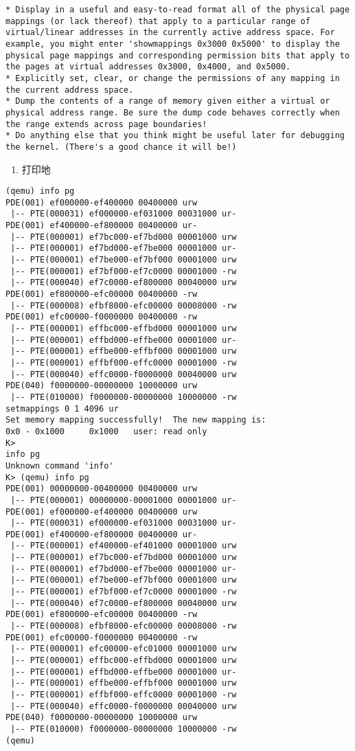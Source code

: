 \documentclass{article}
\begin{document}
\begin{CJK*}{UTF8}{gkai}
\begin{lstlisting}[style=challenge]
* Display in a useful and easy-to-read format all of the physical page mappings (or lack thereof) that apply to a particular range of virtual/linear addresses in the currently active address space. For example, you might enter 'showmappings 0x3000 0x5000' to display the physical page mappings and corresponding permission bits that apply to the pages at virtual addresses 0x3000, 0x4000, and 0x5000.
* Explicitly set, clear, or change the permissions of any mapping in the current address space.
* Dump the contents of a range of memory given either a virtual or physical address range. Be sure the dump code behaves correctly when the range extends across page boundaries!
* Do anything else that you think might be useful later for debugging the kernel. (There's a good chance it will be!)
\end{lstlisting}

\begin{enumerate}
\item{打印地}
\end{enumerate}

\begin{lstlisting}[style=console]
(qemu) info pg
PDE(001) ef000000-ef400000 00400000 urw
 |-- PTE(000031) ef000000-ef031000 00031000 ur-
PDE(001) ef400000-ef800000 00400000 ur-
 |-- PTE(000001) ef7bc000-ef7bd000 00001000 urw
 |-- PTE(000001) ef7bd000-ef7be000 00001000 ur-
 |-- PTE(000001) ef7be000-ef7bf000 00001000 urw
 |-- PTE(000001) ef7bf000-ef7c0000 00001000 -rw
 |-- PTE(000040) ef7c0000-ef800000 00040000 urw
PDE(001) ef800000-efc00000 00400000 -rw
 |-- PTE(000008) efbf8000-efc00000 00008000 -rw
PDE(001) efc00000-f0000000 00400000 -rw
 |-- PTE(000001) effbc000-effbd000 00001000 urw
 |-- PTE(000001) effbd000-effbe000 00001000 ur-
 |-- PTE(000001) effbe000-effbf000 00001000 urw
 |-- PTE(000001) effbf000-effc0000 00001000 -rw
 |-- PTE(000040) effc0000-f0000000 00040000 urw
PDE(040) f0000000-00000000 10000000 urw
 |-- PTE(010000) f0000000-00000000 10000000 -rw
setmappings 0 1 4096 ur
Set memory mapping successfully!  The new mapping is:
0x0 - 0x1000     0x1000   user: read only
K> 
info pg
Unknown command 'info'
K> (qemu) info pg
PDE(001) 00000000-00400000 00400000 urw
 |-- PTE(000001) 00000000-00001000 00001000 ur-
PDE(001) ef000000-ef400000 00400000 urw
 |-- PTE(000031) ef000000-ef031000 00031000 ur-
PDE(001) ef400000-ef800000 00400000 ur-
 |-- PTE(000001) ef400000-ef401000 00001000 urw
 |-- PTE(000001) ef7bc000-ef7bd000 00001000 urw
 |-- PTE(000001) ef7bd000-ef7be000 00001000 ur-
 |-- PTE(000001) ef7be000-ef7bf000 00001000 urw
 |-- PTE(000001) ef7bf000-ef7c0000 00001000 -rw
 |-- PTE(000040) ef7c0000-ef800000 00040000 urw
PDE(001) ef800000-efc00000 00400000 -rw
 |-- PTE(000008) efbf8000-efc00000 00008000 -rw
PDE(001) efc00000-f0000000 00400000 -rw
 |-- PTE(000001) efc00000-efc01000 00001000 urw
 |-- PTE(000001) effbc000-effbd000 00001000 urw
 |-- PTE(000001) effbd000-effbe000 00001000 ur-
 |-- PTE(000001) effbe000-effbf000 00001000 urw
 |-- PTE(000001) effbf000-effc0000 00001000 -rw
 |-- PTE(000040) effc0000-f0000000 00040000 urw
PDE(040) f0000000-00000000 10000000 urw
 |-- PTE(010000) f0000000-00000000 10000000 -rw
(qemu) 
\end{lstlisting}


\end{CJK*}
\end{document}
